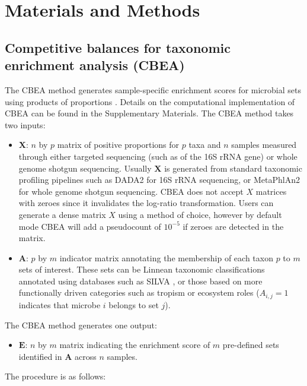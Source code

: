\section{Materials and Methods} \label{methods}
\subsection{Competitive balances for taxonomic enrichment analysis (CBEA)}
The CBEA method generates sample-specific enrichment scores for microbial sets using products of proportions \cite{egozcue2003}. Details on the computational implementation of CBEA can be found in the Supplementary Materials. The CBEA method takes two inputs:  
\begin{itemize}
    \item $\mathbf{X}$: $n$ by $p$ matrix of positive proportions for $p$ taxa and $n$ samples measured through either targeted sequencing (such as of the 16S rRNA gene) or whole genome shotgun sequencing. Usually $\mathbf{X}$ is generated from standard taxonomic profiling pipelines such as DADA2 \cite{callahan2016} for 16S rRNA sequencing, or MetaPhlAn2 \cite{truong2015} for whole genome shotgun sequencing. CBEA does not accept $X$ matrices with zeroes since it invalidates the log-ratio transformation. Users can generate a dense matrix $X$ using a method of choice, however by default mode CBEA will add a pseudocount of $10^{-5}$ if zeroes are detected in the matrix. 
    \item $\mathbf{A}$: $p$ by $m$ indicator matrix annotating the membership of each taxon $p$ to $m$ sets of interest. These sets can be Linnean taxonomic classifications annotated using databases such as SILVA \cite{quast2013}, or those based on more functionally driven categories such as tropism or ecosystem roles ($A_{i,j} = 1$ indicates that microbe $i$ belongs to set $j$). 
\end{itemize}
The CBEA method generates one output:  
\begin{itemize} 
    \item $\mathbf{E}$: $n$ by $m$ matrix indicating the enrichment score of $m$ pre-defined sets identified in $\mathbf{A}$ across $n$ samples. 
\end{itemize}
The procedure is as follows:  
